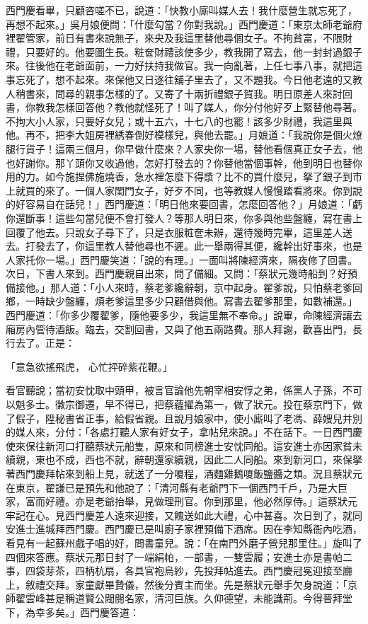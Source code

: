 \begin{showcontents}{}
西門慶看畢，只顧咨嗟不已，說道：「快教小廝叫媒人去！我什麼營生就忘死了，再想不起來。」吳月娘便問：「什麼勾當？你對我說。」西門慶道：「東京太師老爺府裡翟管家，前日有書來說無子，來央及我這里替他尋個女子。不拘貧富，不限財禮，只要好的。他要圖生長。粧奩財禮該使多少，教我開了寫去，他一封封過銀子來。往後他在老爺面前，一力好扶持我做官。我一向亂著，上任七事八事，就把這事忘死了，想不起來。來保他又日逐往舖子里去了，又不題我。今日他老遠的又教人稍書來，問尋的親事怎樣的了。又寄了十兩折禮銀子賀我。明日原差人來討回書，你教我怎樣回答他？教他就怪死了！叫了媒人，你分付他好歹上緊替他尋著。不拘大小人家，只要好女兒；或十五六，十七八的也罷！該多少財禮，我這里與他。再不，把李大姐房裡綉春倒好模樣兒，與他去罷。」月娘道：「我說你是個火燎腿行貨子！這兩三個月，你早做什麼來？人家央你一場，替他看個真正女子去，他也好謝你。那丫頭你又收過他，怎好打發去的？你替他當個事幹，他到明日也替你用的力。如今施捏佛施燒香，急水裡怎麼下得漿？比不的買什麼兒，拏了銀子到市上就買的來了。一個人家閨門女子，好歹不同，也等教媒人慢慢踏看將來。你到說的好容易自在話兒！」西門慶道：「明日他來要回書，怎麼回答他？」月娘道：「虧你還斷事！這些勾當兒便不會打發人？等那人明日來，你多與他些盤纏，寫在書上回覆了他去。只說女子尋下了，只是衣服粧奩未辦，還待幾時完畢，這里差人送去。打發去了，你這里教人替他尋也不遲。此一舉兩得其便，纔幹出好事來，也是人家托你一場。」西門慶笑道：「說的有理。」一面叫將陳經濟來，隔夜修了回書。次日，下書人來到。西門慶親自出來，問了備細。又問：「蔡狀元幾時船到？好預備接他。」那人道：「小人來時，蔡老爹纔辭朝，京中起身。翟爹說，只怕蔡老爹回鄉，一時缺少盤纏，煩老爹這里多少只顧借與他。寫書去翟爹那里，如數補還。」西門慶道：「你多少覆翟爹，隨他要多少，我這里無不奉命。」說畢，命陳經濟讓去廂房內管待酒飯。臨去，交割回書，又與了他五兩路費。那人拜謝，歡喜出門，長行去了。正是：

「意急欲搖飛虎，  心忙抨碎紫花鞭。」

看官聽說；當初安忱取中頭甲，被言官論他先朝宰相安惇之弟，係黨人子孫，不可以魁多士。徽宗御遷，早不得已，把蔡蘊擢為第一，做了狀元。投在蔡京門下，做了假子，陞秘書省正事，給假省親。且說月娘家中，使小廝叫了老馮、薛嫂兒并別的媒人來，分付：「各處打聽人家有好女子，拿帖兒來說。」不在話下。一日西門慶使來保往新河口打聽蔡狀元船隻，原來和同榜進士安忱同船。這安進士亦因家貧未續親，東也不成，西也不就，辭朝還家續親，因此二人同船。來到新河口，來保拏著西門慶拜帖來到船上見，就送了一分嗄程，酒麵雞鵝嗄飯鹽醬之類。況且蔡狀元在東京，翟謙已是預先和他說了：「清河縣有老爺門下一個西門千戶，乃是大巨家，富而好禮。亦是老爺抬舉，見做理刑官。你到那里，他必然厚侍。」這蔡狀元牢記在心。見西門慶差人遠來迎接，又餽送如此大禮，心中甚喜。次日到了，就同安進士進城拜西門慶。西門慶已是叫廚子家裡預備下酒席。因在李知縣衙內吃酒，看見有一起蘇州戲子唱的好，問書童兒。說：「在南門外磨子營兒那里住。」旋叫了四個來答應。蔡狀元那日封了一端絹帕，一部書，一雙雲履；安進士亦是書帕二事，四袋芽茶，四柄杭扇，各具官袍烏紗，先投拜帖進去。西門慶冠冕迎接至廳上，敘禮交拜。家童獻畢贄儀，然後分賓主而坐。先是蔡狀元舉手欠身說道：「京師翟雲峰甚是稱道賢公閥閱名家，清河巨族。久仰德望，未能識荊。今得晉拜堂下，為幸多矣。」西門慶答道：


\end{showcontents}
